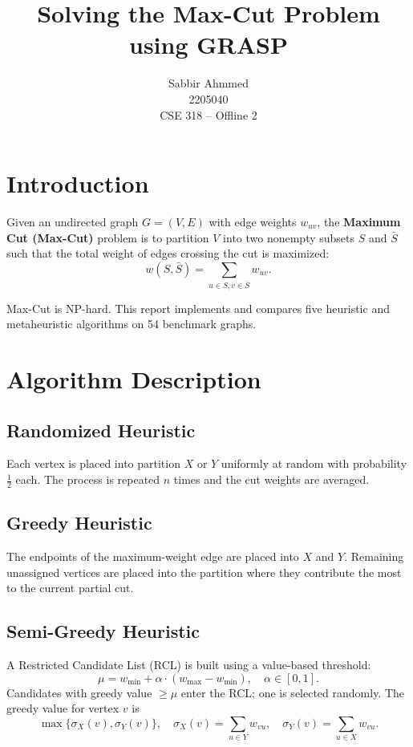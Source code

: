 \documentclass[12pt,a4paper]{article}
\title{Solving the Max-Cut Problem using GRASP}
\author{Sabbir Ahmmed \\ 2205040 \\ CSE 318 -- Offline 2}
\date{}
\begin{document}
\maketitle

\section{Introduction}

Given an undirected graph $G = (V, E)$ with edge weights $w_{uv}$, the
\textbf{Maximum Cut (Max-Cut)} problem is to partition $V$ into two nonempty
subsets $S$ and $\bar{S}$ such that the total weight of edges crossing the cut
is maximized:
\[
w(S, \bar{S}) = \sum_{u \in S, v \in \bar{S}} w_{uv}.
\]

Max-Cut is NP-hard. This report implements and compares five heuristic and
metaheuristic algorithms on 54 benchmark graphs.

\section{Algorithm Description}

\subsection{Randomized Heuristic}
Each vertex is placed into partition $X$ or $Y$ uniformly at random with
probability $\frac12$ each. The process is repeated $n$ times and the cut
weights are averaged.

\subsection{Greedy Heuristic}
The endpoints of the maximum-weight edge are placed into $X$ and $Y$.
Remaining unassigned vertices are placed into the partition where they
contribute the most to the current partial cut.

\subsection{Semi-Greedy Heuristic}
A Restricted Candidate List (RCL) is built using a value-based threshold:
\[
\mu = w_{\min} + \alpha \cdot (w_{\max} - w_{\min}), \quad \alpha \in [0,1].
\]
Candidates with greedy value $\ge \mu$ enter the RCL; one is selected
randomly. The greedy value for vertex $v$ is
\[
\max\bigl\{\sigma_X(v), \sigma_Y(v)\bigr\},\quad
\sigma_X(v) = \sum_{u \in Y} w_{vu},\quad
\sigma_Y(v) = \sum_{u \in X} w_{vu}.
\]
\end{document}
